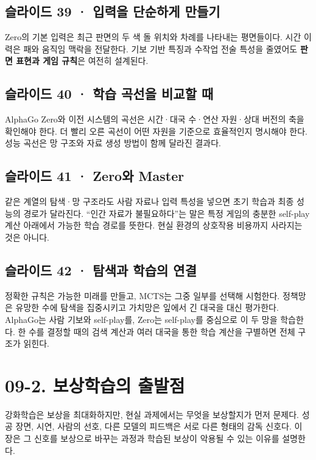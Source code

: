 \documentclass[11pt,a4paper]{article}
\begin{document}
\subsection{슬라이드 39 · 입력을 단순하게 만들기}

Zero의 기본 입력은 최근 판면의 두 색 돌 위치와 차례를 나타내는 평면들이다. 시간 이력은 패와 움직임 맥락을 전달한다. 기보 기반 특징과 수작업 전술 특성을 줄였어도 \textbf{판면 표현과 게임 규칙}은 여전히 설계된다.\par

\subsection{슬라이드 40 · 학습 곡선을 비교할 때}

AlphaGo Zero와 이전 시스템의 곡선은 시간·대국 수·연산 자원·상대 버전의 축을 확인해야 한다. 더 빨리 오른 곡선이 어떤 자원을 기준으로 효율적인지 명시해야 한다. 성능 곡선은 망 구조와 자료 생성 방법이 함께 달라진 결과다.\par

\subsection{슬라이드 41 · Zero와 Master}

같은 계열의 탐색·망 구조라도 사람 자료나 입력 특성을 넣으면 초기 학습과 최종 성능의 경로가 달라진다. “인간 자료가 불필요하다”는 말은 특정 게임의 충분한 self-play 계산 아래에서 가능한 학습 경로를 뜻한다. 현실 환경의 상호작용 비용까지 사라지는 것은 아니다.\par

\subsection{슬라이드 42 · 탐색과 학습의 연결}

정확한 규칙은 가능한 미래를 만들고, MCTS는 그중 일부를 선택해 시험한다. 정책망은 유망한 수에 탐색을 집중시키고 가치망은 잎에서 긴 대국을 대신 평가한다. AlphaGo는 사람 기보와 self-play를, Zero는 self-play를 중심으로 이 두 망을 학습한다. 한 수를 결정할 때의 검색 계산과 여러 대국을 통한 학습 계산을 구별하면 전체 구조가 읽힌다.\par

\clearpage
\section{09-2. 보상학습의 출발점}


강화학습은 보상을 최대화하지만, 현실 과제에서는 무엇을 보상할지가 먼저 문제다. 성공 장면, 시연, 사람의 선호, 다른 모델의 피드백은 서로 다른 형태의 감독 신호다. 이 장은 그 신호를 보상으로 바꾸는 과정과 학습된 보상이 악용될 수 있는 이유를 설명한다.\par
\end{document}
